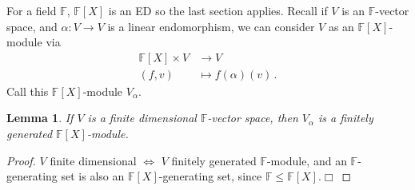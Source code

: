 \documentclass{article}
\theoremstyle{plain}\theoremheaderfont{\normalfont\itshape}\theorembodyfont{\rmfamily}\theoremseparator{.}\newtheorem*{rem}{Remark}\newtheorem*{ex}{Example}\newtheorem*{proof}{Proof}\newtheorem*{altp}{Alternative proof}\newtheorem*{nonex}{Non-Example}
\theoremstyle{plain}\theoremheaderfont{\normalfont\bfseries}\theorembodyfont{\rmfamily}\theoremseparator{.}\newtheorem{thm}{Theorem}[section]\newtheorem{lem}[thm]{Lemma}\newtheorem{prop}[thm]{Proposition}\newtheorem*{cor}{Corollary}\newtheorem{defn}[thm]{Definition}\newtheorem{clm}[thm]{Claim}\newtheorem{clminproof}{Claim}\newtheorem*{notn}{Notation}\newtheorem*{exer}{Exercise}\newtheorem*{lemnn}{Lemma}
\theoremstyle{break}\theoremheaderfont{\normalfont\itshape}\theorembodyfont{\rmfamily}\theoremseparator{.\medskip}\newtheorem*{proofskip}{Proof}\newtheorem*{exs}{Examples}\newtheorem*{rems}{Remarks}\newtheorem*{obs}{Observations}
\theoremstyle{break}\theoremheaderfont{\normalfont\bfseries}\theorembodyfont{\rmfamily}\theoremseparator{.\medskip}\newtheorem{lemskip}[thm]{Lemma}\newtheorem{defnskip}[thm]{Definition}\newtheorem{propskip}[thm]{Proposition}\newtheorem{thmskip}[thm]{Theorem}
\numberwithin{equation}{section}
\newcommand{\qed}{\hfill\ensuremath{\Box}}
\newcommand{\FF}{\mathbb{F}}
\begin{document}
    For a field \(\FF\), \(\FF[X]\) is an ED so the last section applies. Recall if \(V\) is an \(\FF\)-vector space, and \(\alpha:V\to V\) is a linear endomorphism, we can consider \(V\) as an \(\FF[X]\)-module via
    \begin{align*}
        \FF[X]\times V&\longrightarrow V\\
        (f,v)&\longmapsto f(\alpha)(v)\,.
    \end{align*}
    Call this \(\FF[X]\)-module \(V_{\alpha}\).
    \begin{lem}
        If \(V\) is a finite dimensional \(\FF\)-vector space, then \(V_\alpha\) is a finitely generated \(\FF[X]\)-module.
    \end{lem}
    \begin{proof}
        \(V\) finite dimensional \(\iff\) \(V\) finitely generated \(\FF\)-module, and an \(\FF\)-generating set is also an \(\FF[X]\)-generating set, since \(\FF\le\FF[X]\).\qed
    \end{proof}
\end{document}
